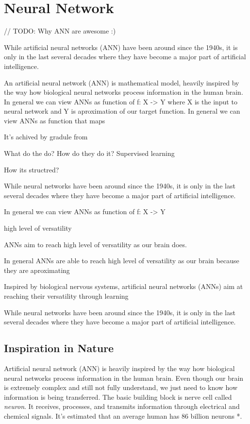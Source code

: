 \chapter{Neural Network}

// TODO: Why ANN are awesome :)

While artificial neural networks (ANN) have been around since the 1940s, it is only in the last several decades where they have become a major part of artificial intelligence.


An artificial neural network (ANN) is mathematical model, heavily inspired by the way how biological neural networks process information in the human brain.
In general we can view ANNs as function of f: X -> Y where X is the input to neural network and Y is aproximation of our target function.
In general we can view ANNs as function that maps

It's achived by gradule from

What do the do?
How do they do it?
Supervised learning

How its structred?

While neural networks have been around since the 1940s, it is only in the last several decades where they have become a major part of artificial intelligence.


In general we can view ANNs as function of f: X -> Y

high level of versatility

ANNs aim to reach high level of versatility as our brain does.

In general ANNs are able to reach high level of versatility as our brain because they are aproximating

Inspired by biological nervous systems, artificial neural networks (ANNs) aim at reaching their versatility through learning

While neural networks have been around since the 1940s, it is only in the last several decades where they have become a major part of artificial intelligence.


\section{Inspiration in Nature}

Artificial neural network (ANN) is heavily inspired by the way how biological neural networks process information in the human brain.
Even though our brain is extremely complex and still not fully understand, we just need to know how information is being transferred.
The basic building block is nerve cell called \textit{neuron}. It receives, processes, and transmits information through electrical and chemical signals.
It's estimated that an average human has 86 billion neurons *.

